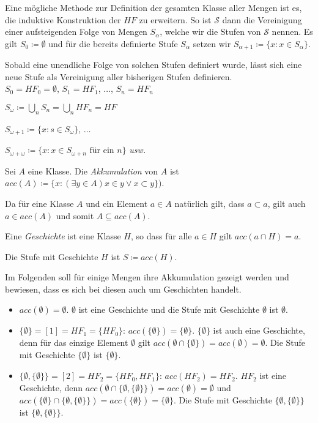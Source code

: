 Eine mögliche Methode zur Definition der gesamten Klasse aller Mengen ist es, die induktive Konstruktion der $HF$ zu erweitern. So ist $\mathcal{S}$ dann die Vereinigung einer aufsteigenden Folge von Mengen $S_\alpha$, welche wir die Stufen von $\mathcal{S}$ nennen. Es gilt $S_0\coloneqq \emptyset$ und für die bereits definierte Stufe $S_\alpha$ setzen wir $S_{\alpha +1}\coloneqq\{x : x\in S_\alpha\}$.

Sobald eine unendliche Folge von solchen Stufen definiert wurde, lässt sich eine neue Stufe als Vereinigung aller bisherigen Stufen definieren.\\

$S_0=HF_0=\emptyset$, $S_1=HF_1$, $\dots$, $S_n=HF_n$

$S_\omega \coloneqq \bigcup\limits_n S_n = \bigcup\limits_n HF_n = HF$

$S_{\omega+1}\coloneqq\{x : s\in S_\omega\}$, $\dots$

$S_{\omega+\omega}\coloneqq\{x : x \in S_{\omega+n} \text{ für ein } n\}$ \textit{usw.}

\begin{definition}
	Sei $A$ eine Klasse. Die \textit{Akkumulation} von $A$ ist $acc(A)\coloneqq\{x : (\exists y \in A) x\in y\lor x \subset y\})$.
\end{definition}

Da für eine Klasse $A$ und ein Element $a\in A$ natürlich gilt, dass $a \subset a$, gilt auch $a\in acc(A)$ und somit $A\subseteq acc(A)$.

\begin{definition}[Geschichten]
	Eine \textit{Geschichte} ist eine Klasse $H$, so dass für alle $a\in H$ gilt $acc(a\cap H)=a$.
\end{definition}

Die Stufe mit Geschichte $H$ ist $S\coloneqq acc(H)$.

\begin{example}
	Im Folgenden soll für einige Mengen ihre Akkumulation gezeigt werden und bewiesen, dass es sich bei diesen auch um Geschichten handelt.
	\begin{itemize}
		\item $acc(\emptyset)=\emptyset$. $\emptyset$ ist eine Geschichte und die Stufe mit Geschichte $\emptyset$ ist $\emptyset$.
		\item $\{\emptyset\} = [1] = HF_1 = \{HF_0\}$: $acc(\{\emptyset\}) = \{\emptyset\}$. 
		$\{\emptyset\}$ ist auch eine Geschichte, denn für das einzige Element $\emptyset$ gilt $acc(\emptyset \cap \{\emptyset\})=acc(\emptyset)=\emptyset$. 
		Die Stufe mit Geschichte $\{\emptyset\}$ ist $\{\emptyset\}$.
		\item $\{\emptyset, \{\emptyset\}\}=[2]=HF_2=\{HF_0, HF_1\}$: $acc(HF_2)=HF_2$.
		$HF_2$ ist eine Geschichte, denn $acc(\emptyset \cap \{\emptyset, \{\emptyset\}\})=acc(\emptyset)=\emptyset$ und $acc(\{\emptyset\}\cap \{\emptyset, \{\emptyset\}\})=acc(\{\emptyset\})=\{\emptyset\}$. Die Stufe mit Geschichte $\{\emptyset, \{\emptyset\}\}$ ist $\{\emptyset, \{\emptyset\}\}$.
	\end{itemize}
\label{GeschichtenBsp}
\end{example}

